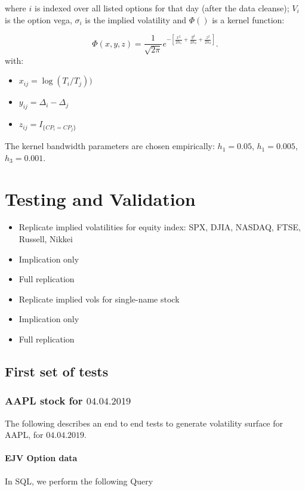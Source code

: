 \documentclass[11pt,confidential]{article}
\begin{document}
\noindent where $i$ is indexed over all listed options for that day (after the data cleanse); $V_i$ is the option
vega, $\sigma_i$ is the implied volatility and $\Phi()$ is a kernel function:

\[\Phi(x,y,z) = \frac{1}{\sqrt{2\pi}}e^{-\left[\frac{x^2}{2h_1}+\frac{y^2}{2h_2}+\frac{z^2}{2h_3}\right]}.\]
\noindent with:
\begin{itemize}
\item $x_{ij}=\log(T_i/T_j))$
\item $y_{ij} = \Delta_i-\Delta_j$
\item $z_{ij} = I_{\{CP_i=CP_j\}}$
\end{itemize}
The kernel bandwidth parameters are chosen empirically: $h_1=0.05$, $h_1=0.005$, $h_3=0.001$.





\section{Testing and Validation}


\begin{itemize}
\item Replicate implied volatilities for equity index: SPX, DJIA, NASDAQ, FTSE, Russell, Nikkei
\item Implication only
\item Full replication 
\item Replicate implied vols for single-name stock
\item Implication only
\item Full replication 
\end{itemize}

\subsection{First set of tests}

\subsubsection{AAPL stock for $04.04.2019$}
The following describes an end to end tests to generate volatility surface for AAPL, for $04.04.2019$.

\paragraph{EJV Option data}

In SQL, we perform the following Query
\end{document}
